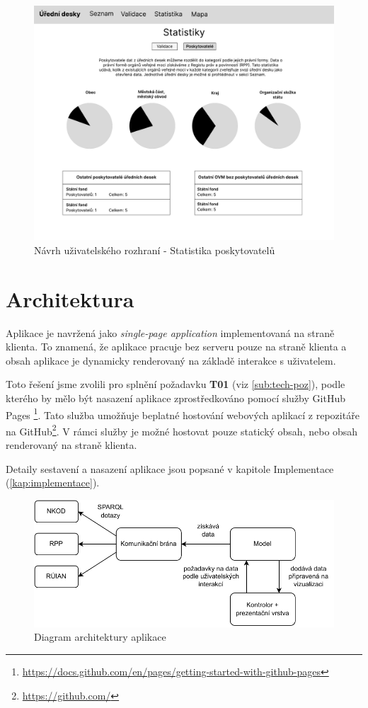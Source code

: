 \begin{figure} 
\includegraphics[width=\textwidth, frame]{cs/obrazky/wireframes/wireframe_statistika_poskytovatele.pdf}
\caption{Návrh uživatelského rozhraní - Statistika poskytovatelů}
\label{fig:stat-poskyt}
\end{figure}


\section{Architektura}\label{sec:architektura}

Aplikace je navržená jako \emph{single-page application} implementovaná na straně klienta. To znamená, že aplikace pracuje bez serveru pouze na straně klienta a obsah aplikace je dynamicky renderovaný na základě interakce s uživatelem.

Toto řešení jsme zvolili pro splnění požadavku \textbf{T01} (viz \autoref{sub:tech-poz}), podle kterého by mělo být nasazení aplikace zprostředkováno pomocí služby GitHub Pages \footnote{\url{https://docs.github.com/en/pages/getting-started-with-github-pages}}. Tato služba umožňuje beplatné hostování webových aplikací z repozitáře na GitHub\footnote{\url{https://github.com/}}. V rámci služby je možné hostovat pouze statický obsah, nebo obsah renderovaný na straně klienta.

Detaily sestavení a nasazení aplikace jsou popsané v kapitole Implementace (\autoref{kap:implementace}).


\begin{figure} 
\includegraphics[width=\textwidth]{cs/obrazky/architektura_diagram.pdf}
\caption{Diagram architektury aplikace}
\label{fig:architektura}
\end{figure}

